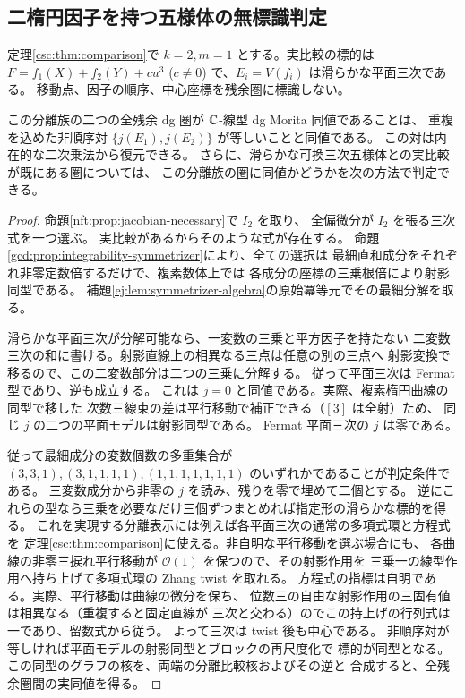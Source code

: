 \subsection{二楕円因子を持つ五様体の無標識判定}
\label{tes:sec:fivefold}
定理\ref{csc:thm:comparison}で $k=2,m=1$ とする。実比較の標的は
$F=f_1(X)+f_2(Y)+cu^3$ ($c\ne0$) で、$E_i=V(f_i)$ は滑らかな平面三次である。
移動点、因子の順序、中心座標を残余圏に標識しない。

\begin{proposition}\label{tes:prop:unordered}
この分離族の二つの全残余 dg 圏が $\mathbb C$-線型 dg Morita 同値であることは、
重複を込めた非順序対 $\{j(E_1),j(E_2)\}$ が等しいことと同値である。
この対は内在的な二次乗法から復元できる。
さらに、滑らかな可換三次五様体との実比較が既にある圏については、
この分離族の圏に同値かどうかを次の方法で判定できる。
\end{proposition}
\begin{proof}
命題\ref{nft:prop:jacobian-necessary}で $I_2$ を取り、
全偏微分が $I_2$ を張る三次式を一つ選ぶ。
実比較があるからそのような式が存在する。
命題\ref{gcd:prop:integrability-symmetrizer}により、全ての選択は
最細直和成分をそれぞれ非零定数倍するだけで、複素数体上では
各成分の座標の三乗根倍により射影同型である。
補題\ref{ej:lem:symmetrizer-algebra}の原始冪等元でその最細分解を取る。

滑らかな平面三次が分解可能なら、一変数の三乗と平方因子を持たない
二変数三次の和に書ける。射影直線上の相異なる三点は任意の別の三点へ
射影変換で移るので、この二変数部分は二つの三乗に分解する。
従って平面三次は Fermat 型であり、逆も成立する。
これは $j=0$ と同値である。実際、複素楕円曲線の同型で移した
次数三線束の差は平行移動で補正できる（$[3]$ は全射）ため、
同じ $j$ の二つの平面モデルは射影同型である。
Fermat 平面三次の $j$ は零である。

従って最細成分の変数個数の多重集合が
$(3,3,1),(3,1,1,1,1),(1,1,1,1,1,1,1)$ のいずれかであることが判定条件である。
三変数成分から非零の $j$ を読み、残りを零で埋めて二個とする。
逆にこれらの型なら三乗を必要なだけ三個ずつまとめれば指定形の滑らかな標的を得る。
これを実現する分離表示には例えば各平面三次の通常の多項式環と方程式を
定理\ref{csc:thm:comparison}に使える。非自明な平行移動を選ぶ場合にも、
各曲線の非零三捩れ平行移動が $\mathcal O(1)$ を保つので、その射影作用を
三乗一の線型作用へ持ち上げて多項式環の Zhang twist を取れる。
方程式の指標は自明である。実際、平行移動は曲線の微分を保ち、
位数三の自由な射影作用の三固有値は相異なる（重複すると固定直線が
三次と交わる）のでこの持上げの行列式は一であり、留数式から従う。
よって三次は twist 後も中心である。
非順序対が等しければ平面モデルの射影同型とブロックの再尺度化で
標的が同型となる。この同型のグラフの核を、両端の分離比較核およびその逆と
合成すると、全残余圏間の実同値を得る。
\end{proof}


